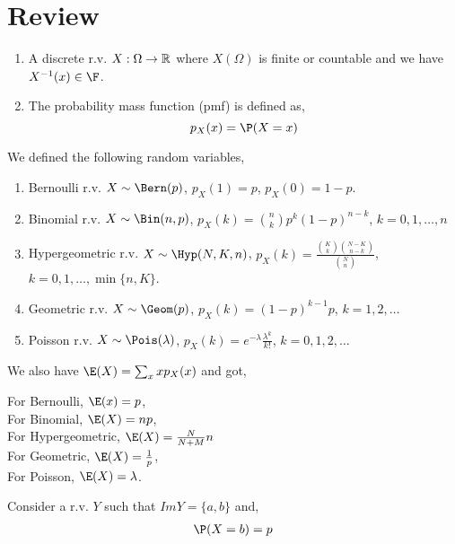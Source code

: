 
\section{Review}

\begin{enumerate}
	\item A discrete r.v. $X: \Omega \to \mathbb{R}$  where $X(\Omega)$ is finite or  countable and we have $X^{-1}(x) \in \F$.

	\item The probability mass function (pmf) is defined as, 
$$ p_X(x) = \P(X = x) $$ 
\end{enumerate}

\begin{eg}
	We defined the following random variables, 
	\begin{enumerate}
		\item Bernoulli r.v. $X \sim \Bern(p)$, $p_X(1) = p$, $p_X(0) = 1-p$.
		\item Binomial r.v. $X \sim \Bin(n,p)$, $p_X(k) = \binom{n}{k} p^k (1-p)^{n-k}$, $k = 0,1,\ldots,n$
		\item Hypergeometric r.v. $X \sim \Hyp(N,K,n)$, $p_X(k) = \frac{\binom{K}{k} \binom{N-K}{n-k}}{\binom{N}{n}}$, $k = 0,1,\ldots,\min\{n,K\}$.
		\item Geometric r.v. $X \sim \Geom(p)$, $p_X(k) = (1-p)^{k-1} p$, $k = 1,2,\ldots$
		\item Poisson r.v. $X \sim \Pois(\lambda)$, $p_X(k) = e^{-\lambda} \frac{\lambda^k}{k!}$, $k = 0,1,2,\ldots$
	\end{enumerate}
\end{eg}

We also have $\E(X) = \sum_x x p_X(x)$ and got, 

\begin{eg}
	For Bernoulli, $\E(x) = p$,\\
	For Binomial, $\E(X) = np$,\\
	For Hypergeometric, $\E(X) = \frac{N}{N + M} n$\\
	For Geometric, $\E(X) = \frac{1}{p}$,\\
	For Poisson, $\E(X) = \lambda$.
\end{eg}

\vspace{1em}

\hline

\vspace{1em}


Consider  a r.v. $Y$ such that  $Im Y = \{a, b\}$ and, 
\begin{align*}
	\P(X = b) = p
\end{align*}

